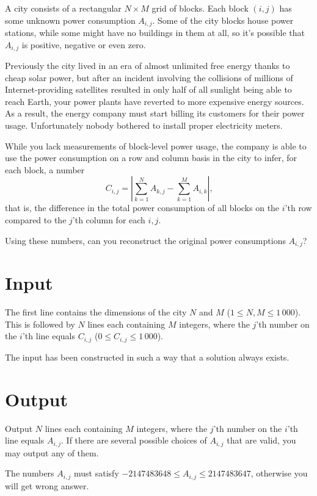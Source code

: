 A city consists of a rectangular $N \times M$ grid of blocks.
Each block $(i, j)$ has some unknown power consumption $A_{i, j}$.
Some of the city blocks house power stations, while some might have no buildings in them at all, so it's possible that $A_{i, j}$ is positive, negative or even zero.

Previously the city lived in an era of almost unlimited free energy thanks to cheap solar power, but after an incident involving the collisions of millions of Internet-providing satellites resulted in only half of all sunlight being able to reach Earth, your power plants have reverted to more expensive energy sources.
As a result, the energy company must start billing its customers for their power usage.
Unfortunately nobody bothered to install proper electricity meters.

While you lack measurements of block-level power usage, the company is able to use the power consumption on a row and column basis in the city to infer, for each block, a number
$$C_{i, j} = \left| \sum_{k=1}^N A_{k, j} - \sum_{k=1}^M A_{i, k} \right| \text{,}$$
that is, the difference in the total power consumption of all blocks on the $i$'th row compared to the $j$'th column for each $i, j$.

Using these numbers, can you reconstruct the original power consumptions $A_{i, j}$?

\section*{Input}
The first line contains the dimensions of the city $N$ and $M$ ($1 \le N, M \le 1\,000$).
This is followed by $N$ lines each containing $M$ integers, where the $j$'th number on the $i$'th line equals $C_{i, j}$ ($0 \le C_{i, j} \le 1\,000$).

The input has been constructed in such a way that a solution always exists.

\section*{Output}
Output $N$ lines each containing $M$ integers, where the $j$'th number on the $i$'th line equals $A_{i, j}$.
If there are several possible choices of $A_{i, j}$ that are valid, you may output any of them.

The numbers $A_{i, j}$ must satisfy $-2147483648 \leq A_{i, j} \leq 2147483647$, otherwise you will get wrong answer.


